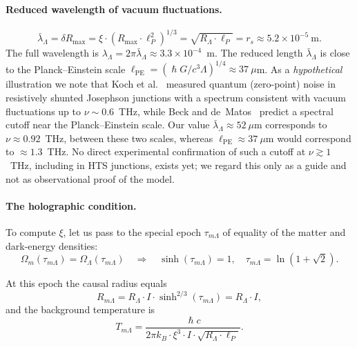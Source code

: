 \documentclass[10pt,a4paper]{article}
\DeclareRobustCommand{\hbar}{\hslash}
\begin{document}
\paragraph{Reduced wavelength of vacuum fluctuations.}
\begin{equation}
\bar\lambda_\Lambda = \delta R_{\max} = \xi \cdot (R_{\max} \cdot \ell_P^2)^{1/3} = \sqrt{R_\Lambda \cdot \ell_P} = r_s \approx 5.2 \times 10^{-5}~\text{m}.
\end{equation}
The full wavelength is $\lambda_\Lambda = 2\pi\bar\lambda_\Lambda \approx 3.3 \times 10^{-4}$~m. The reduced length $\bar\lambda_\Lambda$ is close to the Planck--Einstein scale $\ell_{\mathrm{PE}} = (\hbar G / c^3 \Lambda)^{1/4} \approx 37~\mu$m.
As a \emph{hypothetical} illustration we note that Koch et al.~\cite{Koch1982} measured quantum (zero-point) noise in resistively shunted Josephson junctions with a spectrum consistent with vacuum fluctuations up to $\nu \sim 0.6$~THz, while Beck and de~Matos~\cite{Beck2007} predict a spectral cutoff near the Planck--Einstein scale. Our value $\bar\lambda_\Lambda \approx 52~\mu$m corresponds to $\nu \approx 0.92$~THz, between these two scales, whereas $\ell_{\mathrm{PE}} \approx 37~\mu$m would correspond to $\approx 1.3$~THz. No direct experimental confirmation of such a cutoff at $\nu\gtrsim1$~THz, including in HTS junctions, exists yet; we regard this only as a guide and not as observational proof of the model.

\paragraph{The holographic condition.}
To compute $\xi$, let us pass to the special epoch $\tau_{m\Lambda}$ of equality of the matter and dark-energy densities:
\begin{equation}
\Omega_m(\tau_{m\Lambda}) = \Omega_\Lambda(\tau_{m\Lambda}) \quad\Longrightarrow\quad \sinh(\tau_{m\Lambda}) = 1, \quad \tau_{m\Lambda} = \ln(1 + \sqrt{2}).
\end{equation}

At this epoch the causal radius equals
\begin{equation}
R_{m\Lambda} = R_\Lambda \cdot I \cdot \sinh^{2/3}(\tau_{m\Lambda}) = R_\Lambda \cdot I,
\end{equation}
and the background temperature is
\begin{equation}
T_{m\Lambda} = \frac{\hbar c}{2\pi k_B \cdot \xi^3 \cdot I \cdot \sqrt{R_\Lambda \cdot \ell_P}}.
\end{equation}
\end{document}
